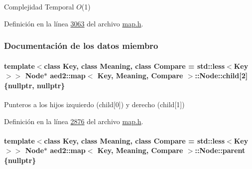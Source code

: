\begin{DoxyDescription}
\item[Complejidad Temporal]$O$(1)
\end{DoxyDescription}

Definición en la línea \hyperlink{map_8h_source_l03063}{3063} del archivo \hyperlink{map_8h_source}{map.\+h}.



\subsubsection{Documentación de los datos miembro}
\paragraph[{\texorpdfstring{child}{child}}]{\setlength{\rightskip}{0pt plus 5cm}template$<$class Key, class Meaning, class Compare = std\+::less$<$\+Key$>$$>$ {\bf Node}$\ast$ {\bf aed2\+::map}$<$ Key, Meaning, Compare $>$\+::Node\+::child\mbox{[}2\mbox{]} \{nullptr, nullptr\}}\hypertarget{structaed2_1_1map_1_1Node_a7d65c374c73c443a46d8fc224aff9e82_a7d65c374c73c443a46d8fc224aff9e82}{}\label{structaed2_1_1map_1_1Node_a7d65c374c73c443a46d8fc224aff9e82_a7d65c374c73c443a46d8fc224aff9e82}


Punteros a los hijos izquierdo (child\mbox{[}0\mbox{]}) y derecho (child\mbox{[}1\mbox{]}) 



Definición en la línea \hyperlink{map_8h_source_l02876}{2876} del archivo \hyperlink{map_8h_source}{map.\+h}.

\paragraph[{\texorpdfstring{parent}{parent}}]{\setlength{\rightskip}{0pt plus 5cm}template$<$class Key, class Meaning, class Compare = std\+::less$<$\+Key$>$$>$ {\bf Node}$\ast$ {\bf aed2\+::map}$<$ Key, Meaning, Compare $>$\+::Node\+::parent \{nullptr\}}\hypertarget{structaed2_1_1map_1_1Node_ab6a5f9e471b311755e4a56834086cb90_ab6a5f9e471b311755e4a56834086cb90}{}\label{structaed2_1_1map_1_1Node_ab6a5f9e471b311755e4a56834086cb90_ab6a5f9e471b311755e4a56834086cb90}


